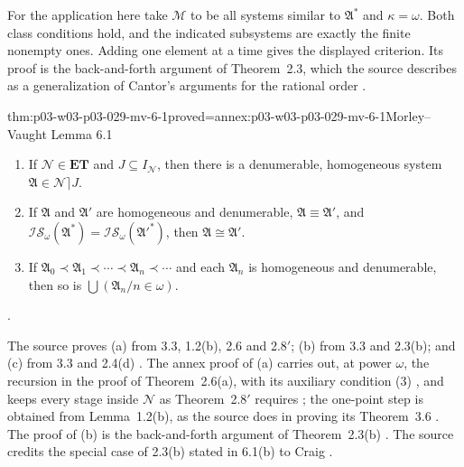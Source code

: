 For the application here take \(\mathscr M\) to be all systems similar
to \(\mathfrak A^*\) and \(\kappa=\omega\). Both class conditions hold,
and the indicated subsystems are exactly the finite nonempty ones.
Adding one element at a time gives the displayed criterion. Its proof is
the back-and-forth argument of Theorem~2.3, which the source describes as
a generalization of Cantor's arguments for the rational order
\cite[pp.~42--43]{MorleyVaught1962}.

\begin{hblemma}{thm:p03-w03-p03-029-mv-6-1}{proved=annex:p03-w03-p03-029-mv-6-1}{Morley--Vaught Lemma 6.1}
\begin{enumerate}
  \item[(a)] If \(\mathscr N\in\mathbf{ET}\) and \(J\subseteq I_{\mathscr
        N}\), then there is a denumerable, homogeneous system \(\mathfrak
        A\in\mathscr N\rceil J\).
  \item[(b)] If \(\mathfrak A\) and \(\mathfrak A'\) are homogeneous and
        denumerable, \(\mathfrak A\equiv\mathfrak A'\), and \(\mathscr
        I\mathscr S_\omega(\mathfrak A^*)=\mathscr I\mathscr
        S_\omega(\mathfrak A'^*)\), then \(\mathfrak A\cong\mathfrak A'\).
  \item[(c)] If \(\mathfrak A_0\prec\mathfrak A_1\prec\cdots\prec\mathfrak
        A_n\prec\cdots\) and each \(\mathfrak A_n\) is homogeneous and
        denumerable, then so is \(\bigcup(\mathfrak A_n/n\in\omega)\).
\end{enumerate}
\cite[p.~55, Lemma~6.1]{MorleyVaught1962}.
\end{hblemma}

The source proves (a) from 3.3, 1.2(b), 2.6 and 2.8\('\); (b) from 3.3 and
2.3(b); and (c) from 3.3 and 2.4(d) \cite[p.~55]{MorleyVaught1962}. The
annex proof of (a) carries out, at power \(\omega\), the recursion in the
proof of Theorem~2.6(a), with its auxiliary condition (3)
\cite[pp.~43--44]{MorleyVaught1962}, and keeps every stage inside
\(\mathscr N\) as Theorem~2.8\('\) requires \cite[pp.~45--46]{MorleyVaught1962};
the one-point step is obtained from Lemma~1.2(b), as the source does in
proving its Theorem~3.6 \cite[p.~50]{MorleyVaught1962}. The proof of (b) is
the back-and-forth argument of Theorem~2.3(b)
\cite[pp.~42--43]{MorleyVaught1962}. The source credits the special case of
2.3(b) stated in 6.1(b) to Craig \cite[p.~43, footnote~5]{MorleyVaught1962}.

